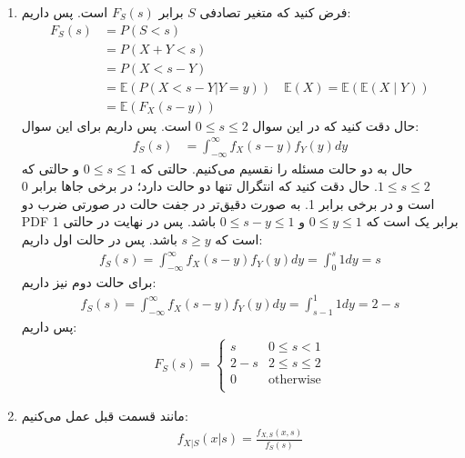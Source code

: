 \begin{enumerate}
    \item فرض کنید که  متغیر تصادفی $S$ برابر $F_S(s)$ است.
    پس داریم:
    \begin{align*}
        F_S(s) &= P(S < s)\\
        &= P(X + Y < s)\\
        &= P(X < s - Y)\\
        &= \mathbb{E}(P(X < s - Y | Y = y)) \quad \mathbb{E} (X) = \mathbb{E} ( \mathbb{E} ( X \mid Y))\\
        &= \mathbb{E}(F_X(s - y)) 
    \end{align*}
    حال دقت کنید که در این سوال
    $0 \le s \le 2$
    است.
    پس داریم برای این سوال:
    \begin{align*}
        f_S(s) & = \int_{-\infty}^\infty f_X(s-y)f_Y(y) dy
    \end{align*}
    حال به دو حالت مسئله را نقسیم می‌کنیم. حالتی که
    $0 \le s \le 1$
    و حالتی که 
    $1 \le s \le 2$.
    حال دقت کنید که انتگرال تنها دو حالت دارد؛ در برخی جا‌ها برابر 0 است و در برخی برابر 1.
    به صورت دقیق‌تر در جفت حالت در صورتی ضرب دو PDF برابر یک است که
    $0 \le y \le 1$
    و
    $0 \le s - y \le 1$
    باشد. پس در نهایت در حالتی 1 است که
    $s \ge y$
    باشد. پس در حالت اول داریم:
    \begin{gather*}
        f_S(s) = \int_{-\infty}^\infty f_X(s-y)f_Y(y) dy = \int_0^s 1 dy = s
    \end{gather*}
    برای حالت دوم نیز داریم:
    \begin{gather*}
        f_S(s) = \int_{-\infty}^\infty f_X(s-y)f_Y(y) dy = \int_{s - 1}^1 1 dy = 2 - s
    \end{gather*}
    پس داریم:
    \begin{gather*}
        F_S(s) =
            \begin{cases}
              s & 0 \le s < 1\\
              2 - s & 2 \le s \le 2\\
              0 & \text{otherwise}\\
            \end{cases}
    \end{gather*}
    \item مانند قسمت قبل عمل می‌کنیم:
    \begin{gather*}
        f_{X|S}(x | s) = \frac{f_{X,S}(x, s)}{f_S(s)}
    \end{gather*}
\end{enumerate}